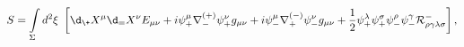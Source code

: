 \begin{equation}
  \label{sigmamodel}
  S= \int\limits_{\Sigma} d^2\xi\,\,
  \left [ \d_\+ X^\mu \d_= X^\nu E_{\mu\nu}  +
    i \psi^\mu_+\nabla^{(+)}_- \psi_+^\nu
    g_{\mu\nu} + i \psi_-^\mu \nabla^{(-)}_+ \psi^\nu_- g_{\mu\nu} +
    \frac{1}{2} \psi^\lambda_+ \psi_+^\sigma \psi_-^\rho \psi_-^\gamma
    {\cal R}^{-}_{\rho\gamma\lambda\sigma} \right ],
\end{equation}

